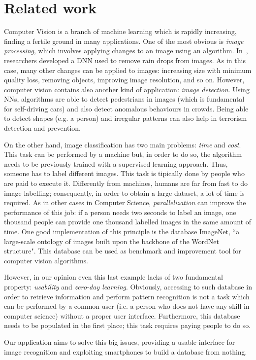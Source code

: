 \section{Related work}

Computer Vision is a branch of machine learning which is rapidly increasing, finding a fertile ground in many applications. One of the most obvious is \textit{image processing}, which involves applying changes to an image using an algorithm. In~\cite{Rain}, researchers developed a DNN used to remove rain drops from images. As in this case, many other changes can be applied to images: increasing size with minimum quality loss, removing objects, improving image resolution, and so on. However, computer vision contains also another kind of application: \textit{image detection}. Using NNs, algorithms are able to detect pedestrians in images\cite{Pedestrian} (which is fundamental for self-driving cars) and also detect anomalous behaviours in crowds\cite{Crowd}. Being able to detect shapes (e.g. a person) and irregular patterns can also help in terrorism detection and prevention.

On the other hand, image classification has two main problems: \textit{time} and \textit{cost}. This task can be performed by a machine but, in order to do so, the algorithm needs to be previously trained with a supervised learning approach. Thus, someone has to label different images. This task is tipically done by people who are paid to execute it. Differently from machines, humans are far from fast to do image labelling; consequently, in order to obtain a large dataset, a lot of time is required.
As in other cases in Computer Science, \textit{parallelization} can improve the performance of this job: if a person needs two seconds to label an image, one thousand people can provide one thousand labelled images in the same amount of time. One good implementation of this principle is the database ImageNet\cite{ImageNet2}, ``a large-scale ontology of images built upon the backbone of the WordNet structure"\cite{ImageNet1}. This database can be used as benchmark and improvement tool for computer vision algorithms.

However, in our opinion even this last example lacks of two fundamental property: \textit{usability} and \textit{zero-day learning}. Obviously, accessing to such database in order to retrieve information and perform pattern recognition is not a task which can be performed by a common user (i.e. a person who does not have any skill in computer science) without a proper user interface. Furthermore, this database needs to be populated in the first place; this task requires paying people to do so.

Our application aims to solve this big issues, providing a usable interface for image recognition and exploiting smartphones to build a database from nothing.


